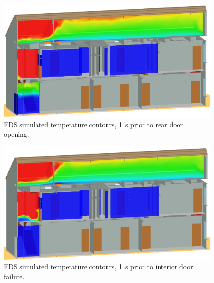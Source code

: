 \documentclass[12pt,oneside]{book}
\begin{document}
\begin{figure}[!ht]
\includegraphics[width=.675\textwidth]{../Figures/west_50th_baseline_129}
 

\caption{FDS simulated temperature contours, 1~s prior to rear door opening.}
\label{fig:temp_129s}
\end{figure}

\begin{figure}[!ht]
\includegraphics[width=.675\textwidth]{../Figures/west_50th_baseline_159}
 

\caption{FDS simulated temperature contours, 1~s prior to interior door failure.}
\label{fig:temp_159s}
\end{figure}
\end{document}
